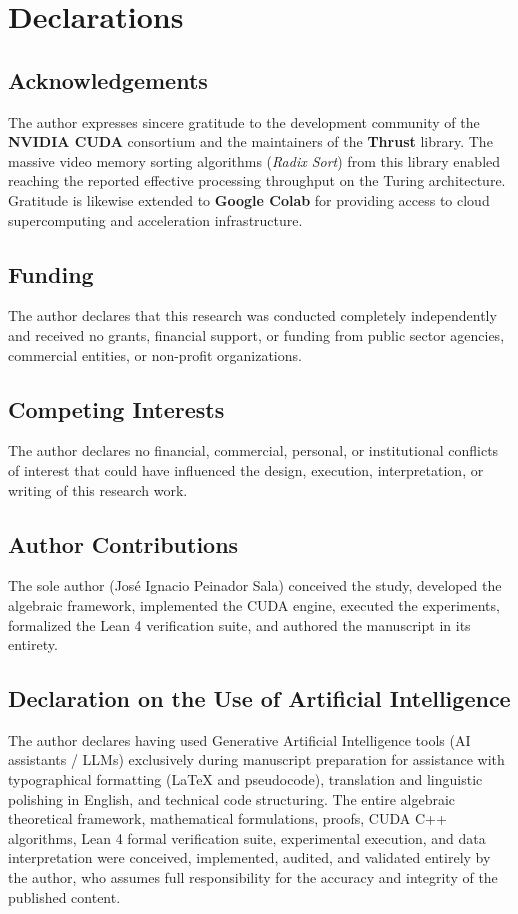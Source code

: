 \documentclass[11pt,a4paper]{article}
\theoremstyle{plain}
\theoremstyle{definition}
\numberwithin{equation}{section}
\begin{document}
\section*{Declarations}

\subsection*{Acknowledgements}
The author expresses sincere gratitude to the development community of the \textbf{NVIDIA CUDA} consortium and the maintainers of the \textbf{Thrust} library. The massive video memory sorting algorithms (\emph{Radix Sort}) from this library enabled reaching the reported effective processing throughput on the Turing architecture. Gratitude is likewise extended to \textbf{Google Colab} for providing access to cloud supercomputing and acceleration infrastructure.

\subsection*{Funding}
The author declares that this research was conducted completely independently and received no grants, financial support, or funding from public sector agencies, commercial entities, or non-profit organizations.

\subsection*{Competing Interests}
The author declares no financial, commercial, personal, or institutional conflicts of interest that could have influenced the design, execution, interpretation, or writing of this research work.

\subsection*{Author Contributions}
The sole author (José Ignacio Peinador Sala) conceived the study, developed the algebraic framework, implemented the CUDA engine, executed the experiments, formalized the Lean 4 verification suite, and authored the manuscript in its entirety.

\subsection*{Declaration on the Use of Artificial Intelligence}
The author declares having used Generative Artificial Intelligence tools (AI assistants / LLMs) exclusively during manuscript preparation for assistance with typographical formatting (LaTeX and pseudocode), translation and linguistic polishing in English, and technical code structuring. The entire algebraic theoretical framework, mathematical formulations, proofs, CUDA C++ algorithms, Lean 4 formal verification suite, experimental execution, and data interpretation were conceived, implemented, audited, and validated entirely by the author, who assumes full responsibility for the accuracy and integrity of the published content.
\end{document}
